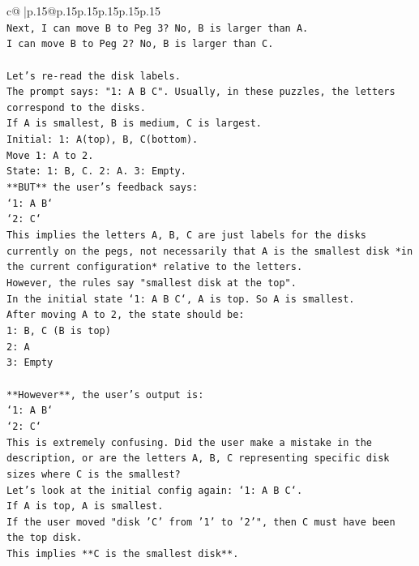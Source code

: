 \documentclass{article}
\begin{document}
{\begin{supertabular}{c@{$\;$}|p{.15\linewidth}@{}p{.15\linewidth}p{.15\linewidth}p{.15\linewidth}p{.15\linewidth}p{.15\linewidth}}
{{{\\ 
\texttt{Next, I can move B to Peg 3? No, B is larger than A.} \\
\texttt{I can move B to Peg 2? No, B is larger than C.} \\
\\ 
\texttt{Let's re{-}read the disk labels.} \\
\texttt{The prompt says: "1: A B C". Usually, in these puzzles, the letters correspond to the disks.} \\
\texttt{If A is smallest, B is medium, C is largest.} \\
\texttt{Initial: 1: A(top), B, C(bottom).} \\
\texttt{Move 1: A to 2.} \\
\texttt{State: 1: B, C. 2: A. 3: Empty.} \\
\texttt{**BUT** the user's feedback says:} \\
\texttt{`1: A B`} \\
\texttt{`2: C`} \\
\texttt{This implies the letters A, B, C are just labels for the disks currently on the pegs, not necessarily that A is the smallest disk *in the current configuration* relative to the letters.} \\
\texttt{However, the rules say "smallest disk at the top".} \\
\texttt{In the initial state `1: A B C`, A is top. So A is smallest.} \\
\texttt{After moving A to 2, the state should be:} \\
\texttt{1: B, C (B is top)} \\
\texttt{2: A} \\
\texttt{3: Empty} \\
\\ 
\texttt{**However**, the user's output is:} \\
\texttt{`1: A B`} \\
\texttt{`2: C`} \\
\texttt{This is extremely confusing. Did the user make a mistake in the description, or are the letters A, B, C representing specific disk sizes where C is the smallest?} \\
\texttt{Let's look at the initial config again: `1: A B C`.} \\
\texttt{If A is top, A is smallest.} \\
\texttt{If the user moved "disk 'C' from '1' to '2'", then C must have been the top disk.} \\
\texttt{This implies **C is the smallest disk**.} \\
}}}
\end{supertabular}}
\end{document}
